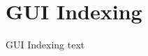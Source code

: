 
\section{GUI Indexing}\fbeg{}\begin{frame}{}

{\fontsize{20}{23}\selectfont

GUI Indexing text

}

\end{frame}

